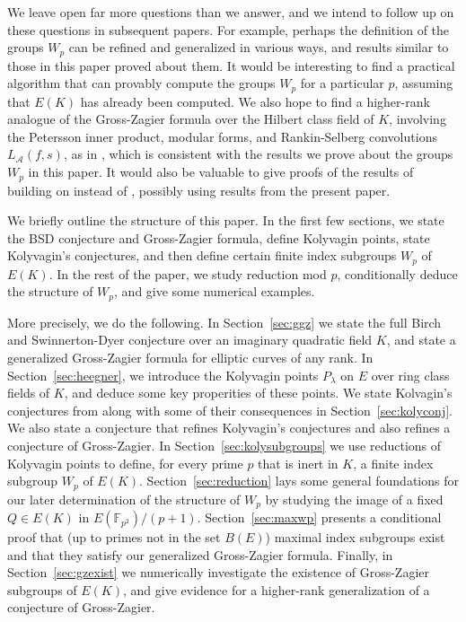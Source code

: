 \documentclass{oupau}
\newcommand{\FF}{\mathbb{F}}
\begin{document}
We leave open far more questions than we answer, and we intend to
follow up on these questions in subsequent papers.  For example,
perhaps the definition of the groups $W_p$ can be refined and
generalized in various ways, and results similar to those in this
paper proved about them.  It would be interesting to find a practical
algorithm that can provably compute the groups $W_p$ for a particular
$p$, assuming that $E(K)$ has already been computed.  We also hope to
find a higher-rank analogue of the Gross-Zagier formula over the
Hilbert class field of $K$, involving the Petersson inner product,
modular forms, and Rankin-Selberg convolutions $L_{\mathcal{A}}(f,s)$,
as in \cite{gross-zagier}, which is consistent with the results we
prove about the groups $W_p$ in this paper.  It would also be valuable
to give proofs of the results of \cite{kolyvagin:structure_of_selmer}
building on \cite{mccallum:kolyvagin} instead of
\cite{kolyvagin:structureofsha}, possibly using results from the
present paper.

We briefly outline the structure of this paper. In the first few
sections, we state the BSD conjecture and Gross-Zagier formula, define
Kolyvagin points, state Kolyvagin's conjectures, and then define
certain finite index subgroups $W_p$ of $E(K)$.  In the rest of the
paper, we study reduction mod $p$, conditionally deduce the structure
of $W_p$, and give some numerical examples.

More precisely, we do the following.  In Section~\ref{sec:ggz} we
state the full Birch and Swinnerton-Dyer conjecture over an imaginary
quadratic field $K$, and state a generalized Gross-Zagier formula for
elliptic curves of any rank.  In Section~\ref{sec:heegner}, we
introduce the Kolyvagin points $P_{\lambda}$ on $E$ over ring class
fields of $K$, and deduce some key properities of these points.  We
state Kolvagin's conjectures from \cite{kolyvagin:structure_of_selmer}
along with some of their consequences in Section~\ref{sec:kolyconj}.
We also state a conjecture that refines Kolyvagin's conjectures and
also refines a conjecture of Gross-Zagier.  In
Section~\ref{sec:kolysubgroups} we use reductions of Kolyvagin points
to define, for every prime $p$ that is inert in $K$, a finite index
subgroup $W_p$ of $E(K)$.  Section~\ref{sec:reduction} lays some
general foundations for our later determination of the structure of
$W_p$ by studying the image of a fixed $Q\in E(K)$ in
$E(\FF_{p^2})/(p+1)$.  Section~\ref{sec:maxwp} presents a conditional
proof that (up to primes not in the set $B(E)$) maximal index
subgroups exist and that they satisfy our generalized Gross-Zagier
formula.  Finally, in Section~\ref{sec:gzexist} we numerically
investigate the existence of Gross-Zagier subgroups of $E(K)$, and
give evidence for a higher-rank generalization of a conjecture of
Gross-Zagier.
\end{document}
